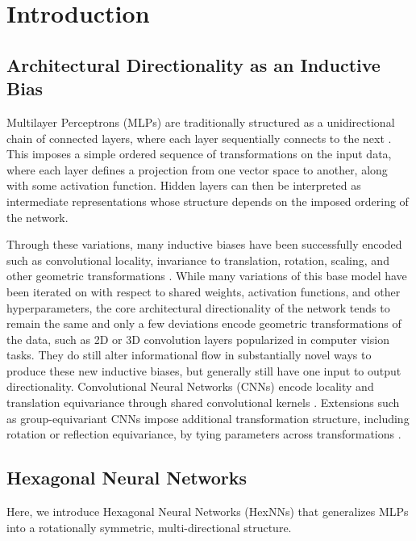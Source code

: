 \section{Introduction}

\subsection{Architectural Directionality as an Inductive Bias}

Multilayer Perceptrons (MLPs) are traditionally structured as a unidirectional chain of connected layers, where each layer sequentially connects to the next \cite{cybenko1989approximation,hornik1989multilayer}.
This imposes a simple ordered sequence of transformations on the input data, where each layer defines a projection from one vector space to another, along with some activation function.
Hidden layers can then be interpreted as intermediate representations whose structure depends on the imposed ordering of the network.

Through these variations, many inductive biases have been successfully encoded such as convolutional locality, invariance to translation, rotation, scaling, and other geometric transformations \cite{lecun1998gradient,cohen2016group,worrall2017harmonic,jaderberg2015spatial,sabour2017dynamic}.
While many variations of this base model have been iterated on with respect to shared weights, activation functions, and other hyperparameters, the core architectural directionality of the network tends to remain the same and only a few deviations encode geometric transformations of the data, such as 2D or 3D convolution layers popularized in computer vision tasks.
They do still alter informational flow in substantially novel ways to produce these new inductive biases, but generally still have one input to output directionality.
Convolutional Neural Networks (CNNs) encode locality and translation equivariance through shared convolutional kernels \cite{lecun1998gradient,fukushima1980neocognitron}.
Extensions such as group-equivariant CNNs impose additional transformation structure, including rotation or reflection equivariance, by tying parameters across transformations \cite{cohen2016group,worrall2017harmonic}.

\subsection{Hexagonal Neural Networks}

Here, we introduce Hexagonal Neural Networks (HexNNs) that generalizes MLPs into a rotationally symmetric, multi-directional structure.

